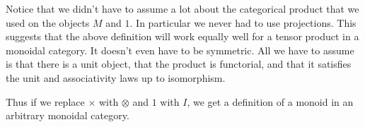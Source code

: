 \documentclass[DaoFP]{subfiles}
\begin{document}
Notice that we didn't have to assume a lot about the categorical product that we used on the objects $M$ and $1$. In particular we never had to use projections. This suggests that the above definition will work equally well for a tensor product in a monoidal category. It doesn't even have to be symmetric. All we have to assume is that there is a unit object, that the product is functorial, and that it satisfies the unit and associativity laws up to isomorphism.

Thus if we replace $\times$ with $\otimes$ and $1$ with $I$, we get a definition of a monoid in an arbitrary monoidal category.
\end{document}
